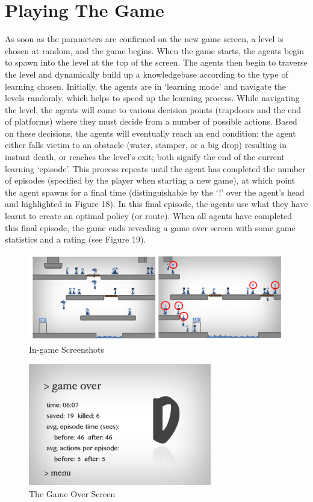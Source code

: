 \documentclass[a4paper,oneside]{report}
\begin{document}
\section{Playing The Game}

As soon as the parameters are confirmed on the new game screen, a level is chosen at random, and the game begins. When the game starts, the agents begin to spawn into the level at the top of the screen. The agents then begin to traverse the level and dynamically build up a knowledgebase according to the type of learning chosen. Initially, the agents are in `learning mode' and navigate the levels randomly, which helps to speed up the learning process. While navigating the level, the agents will come to various decision points (trapdoors and the end of platforms) where they must decide from a number of possible actions. Based on these decisions, the agents will eventually reach an end condition: the agent either falls victim to an obstacle (water, stamper, or a big drop) resulting in instant death, or reaches the level's exit; both signify the end of the current learning `episode'. This process repeats until the agent has completed the number of episodes (specified by the player when starting a new game), at which point the agent spawns for a final time (distinguishable by the `!' over the agent's head and highlighted in Figure 18). In this final episode, the agents use what they have learnt to create an optimal policy (or route). When all agents have completed this final episode, the game ends revealing a game over screen with some game statistics and a rating (see Figure 19).

\begin{figure}[h!]
  \centering
    \includegraphics[width=140mm]{sources/images/Screen_Game}
    \caption{In-game Screenshots}
\end{figure}

\begin{figure}
  \centering
    \includegraphics[width=80mm]{sources/images/Screen_GameOver}
    \caption{The Game Over Screen}
\end{figure}
\end{document}
